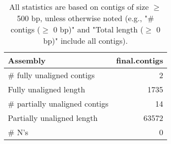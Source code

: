 \documentclass[12pt,a4paper]{article}
\begin{document}
\begin{table}[ht]
\begin{center}
\caption{All statistics are based on contigs of size $\geq$ 500 bp, unless otherwise noted (e.g., "\# contigs ($\geq$ 0 bp)" and "Total length ($\geq$ 0 bp)" include all contigs).}
\begin{tabular}{|l*{1}{|r}|}
\hline
Assembly & final.contigs \\ \hline
\# fully unaligned contigs & 2 \\ \hline
Fully unaligned length & 1735 \\ \hline
\# partially unaligned contigs & 14 \\ \hline
Partially unaligned length & 63572 \\ \hline
\# N's & 0 \\ \hline
\end{tabular}
\end{center}
\end{table}
\end{document}
